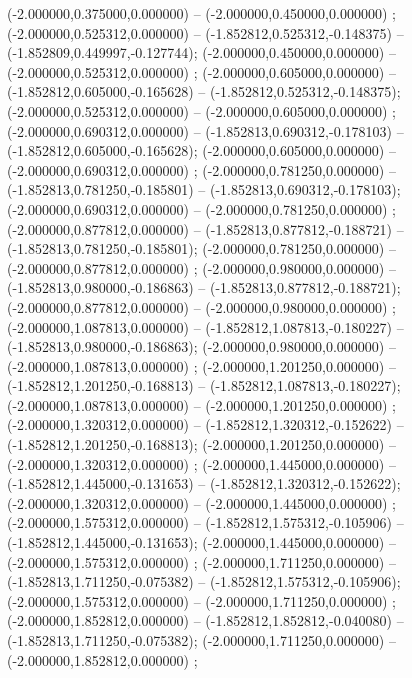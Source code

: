  (-2.000000,0.375000,0.000000) -- (-2.000000,0.450000,0.000000) ;
 (-2.000000,0.525312,0.000000) -- (-1.852812,0.525312,-0.148375) -- (-1.852809,0.449997,-0.127744);
 (-2.000000,0.450000,0.000000) -- (-2.000000,0.525312,0.000000) ;
 (-2.000000,0.605000,0.000000) -- (-1.852812,0.605000,-0.165628) -- (-1.852812,0.525312,-0.148375);
 (-2.000000,0.525312,0.000000) -- (-2.000000,0.605000,0.000000) ;
 (-2.000000,0.690312,0.000000) -- (-1.852813,0.690312,-0.178103) -- (-1.852812,0.605000,-0.165628);
 (-2.000000,0.605000,0.000000) -- (-2.000000,0.690312,0.000000) ;
 (-2.000000,0.781250,0.000000) -- (-1.852813,0.781250,-0.185801) -- (-1.852813,0.690312,-0.178103);
 (-2.000000,0.690312,0.000000) -- (-2.000000,0.781250,0.000000) ;
 (-2.000000,0.877812,0.000000) -- (-1.852813,0.877812,-0.188721) -- (-1.852813,0.781250,-0.185801);
 (-2.000000,0.781250,0.000000) -- (-2.000000,0.877812,0.000000) ;
 (-2.000000,0.980000,0.000000) -- (-1.852813,0.980000,-0.186863) -- (-1.852813,0.877812,-0.188721);
 (-2.000000,0.877812,0.000000) -- (-2.000000,0.980000,0.000000) ;
 (-2.000000,1.087813,0.000000) -- (-1.852812,1.087813,-0.180227) -- (-1.852813,0.980000,-0.186863);
 (-2.000000,0.980000,0.000000) -- (-2.000000,1.087813,0.000000) ;
 (-2.000000,1.201250,0.000000) -- (-1.852812,1.201250,-0.168813) -- (-1.852812,1.087813,-0.180227);
 (-2.000000,1.087813,0.000000) -- (-2.000000,1.201250,0.000000) ;
 (-2.000000,1.320312,0.000000) -- (-1.852812,1.320312,-0.152622) -- (-1.852812,1.201250,-0.168813);
 (-2.000000,1.201250,0.000000) -- (-2.000000,1.320312,0.000000) ;
 (-2.000000,1.445000,0.000000) -- (-1.852812,1.445000,-0.131653) -- (-1.852812,1.320312,-0.152622);
 (-2.000000,1.320312,0.000000) -- (-2.000000,1.445000,0.000000) ;
 (-2.000000,1.575312,0.000000) -- (-1.852812,1.575312,-0.105906) -- (-1.852812,1.445000,-0.131653);
 (-2.000000,1.445000,0.000000) -- (-2.000000,1.575312,0.000000) ;
 (-2.000000,1.711250,0.000000) -- (-1.852813,1.711250,-0.075382) -- (-1.852812,1.575312,-0.105906);
 (-2.000000,1.575312,0.000000) -- (-2.000000,1.711250,0.000000) ;
 (-2.000000,1.852812,0.000000) -- (-1.852812,1.852812,-0.040080) -- (-1.852813,1.711250,-0.075382);
 (-2.000000,1.711250,0.000000) -- (-2.000000,1.852812,0.000000) ;
